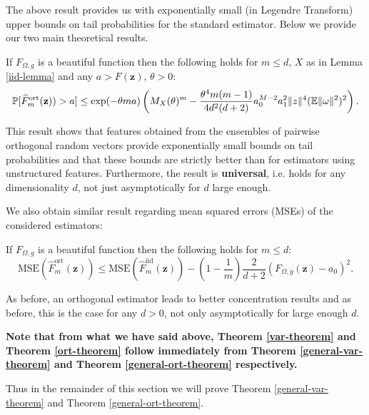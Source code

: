 The above result provides us with exponentially small (in Legendre Transform) upper bounds on tail probabilities for the standard estimator.
Below we provide our two main theoretical results. 

\begin{theorem}
\label{general-ort-theorem}
If $F_{\Omega, g}$ is a beautiful function then the following holds for $m \leq d$, $X$ as in Lemma \ref{iid-lemma} and any $a>F(\mathbf{z})$, $\theta > 0$: 
\begin{equation}
\mathbb{P}[\widehat{F}^{\mathrm{ort}}_{m}(\mathbf{z})) > a] \leq \exp(-\theta m a) \left( M_X (\theta)^m - \frac{\theta^4 m (m - 1)}{4 d^2 (d + 2)} a_0^{M - 2} a_1^2 \| \*z \|^4 (\mathbb{E} \| \omega \|^2)^2 \right).
\end{equation}
\end{theorem}

This result shows that features obtained from the ensembles of pairwise orthogonal random vectors provide exponentially small bounds on tail probabilities and that these bounds are strictly better than for estimators using unstructured features. Furthermore, the result is \textbf{universal}, i.e. holds for any dimensionality $d$, not just asymptotically for $d$ large enough.

We also obtain similar result regarding mean squared errors (MSEs) of the considered estimators:

\begin{theorem}
\label{general-var-theorem}
If $F_{\Omega, g}$ is a beautiful function then the following holds for $m \leq d$: 
\begin{equation}
\mathrm{MSE}(\widehat{F}^{\mathrm{ort}}_{m}(\mathbf{z})) \leq 
\mathrm{MSE}(\widehat{F}^{\mathrm{iid}}_{m}(\mathbf{z})) - (1-\frac{1}{m})\frac{2}{d+2}\left(F_{\Omega,g}(\mathbf{z}) - a_0 \right)^2.
\end{equation}
\end{theorem}
As before, an orthogonal estimator leads to better concentration results and as before, this is the case for any $d>0$, not only asymptotically for large enough $d$.

\textbf{Note that from what we have said above, Theorem \ref{var-theorem} and Theorem \ref{ort-theorem} follow immediately from Theorem \ref{general-var-theorem} and Theorem \ref{general-ort-theorem} respectively.} 

Thus in the remainder of this section we will prove Theorem \ref{general-var-theorem} and Theorem \ref{general-ort-theorem}.


